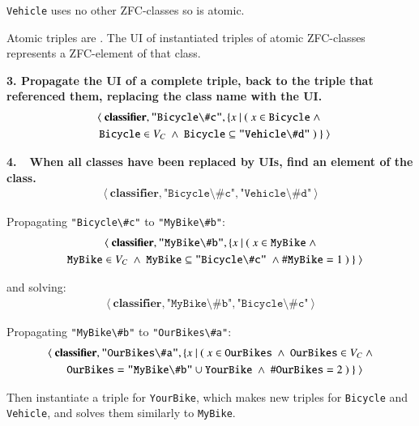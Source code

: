 \texttt{Vehicle} uses no other ZFC-classes so is atomic.

Atomic triples are .  The UI of instantiated triples of atomic ZFC-classes represents a ZFC-element of that class.

\textbf{3.  Propagate the UI of a complete triple, back to the triple that referenced them, replacing the class name with the UI.}
\begin{gather}
\langle~\textbf{classifier},\texttt{"Bicycle\textbackslash\#c"},\{x~\vert ~(~ x \in \texttt{Bicycle} ~\wedge~ \notag \\
~~~ \texttt{Bicycle}\in V_C~\wedge~ \texttt{Bicycle}\subseteq\texttt{"Vehicle\textbackslash\#d"}~)~\}~\rangle
\end{gather}

\textbf{4.~~When all classes have been replaced by UIs, find an element of the class.}
\begin{gather}
\langle~\textbf{classifier},\texttt{"Bicycle\textbackslash\#c"},\texttt{"Vehicle\textbackslash\#d"}~\rangle
\end{gather}

Propagating \texttt{"Bicycle\textbackslash\#c"} to \texttt{"MyBike\textbackslash\#b"}:
\begin{gather}
\langle~\textbf{classifier},\texttt{"MyBike\textbackslash\#b"},\{x~\vert ~(~ x \in \texttt{MyBike}~ \wedge \notag \\
 ~~~\texttt{MyBike}\in V_C~\wedge~ \texttt{MyBike}\subseteq\texttt{"Bicycle\textbackslash\#c"}~\wedge \#\texttt{MyBike}=1~)~\}~\rangle
\end{gather}

and solving:
\begin{gather}
\langle~\textbf{classifier},\texttt{"MyBike\textbackslash\#b"},\texttt{"Bicycle\textbackslash\#c"}~\rangle
\end{gather}

Propagating \texttt{"MyBike\textbackslash\#b"} to \texttt{"OurBikes\textbackslash\#a"}:
\begin{gather}
\langle~\textbf{classifier},\texttt{"OurBikes\textbackslash\#a"}, \{x~\vert ~(~ x \in \texttt{OurBikes}~\wedge~\texttt{OurBikes}\in V_C~ \wedge \notag \\
 ~~~  \texttt{OurBikes}=\texttt{"MyBike\textbackslash\#b"}\cup\texttt{YourBike}~\wedge~\#\texttt{OurBikes}=2~)~\}~\rangle
\end{gather}

Then instantiate a triple for \texttt{YourBike}, which makes new triples for \texttt{Bicycle} and \texttt{Vehicle}, and solves them similarly to \texttt{MyBike}.

